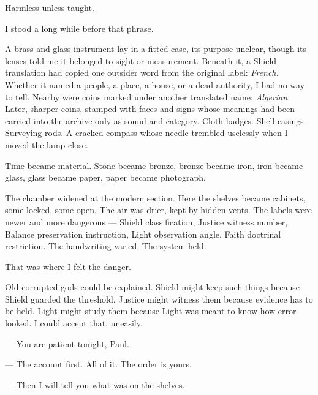 Harmless unless taught.\par

I stood a long while before that phrase.\par

A brass-and-glass instrument lay in a fitted case, its purpose unclear, though its lenses told me it belonged to sight or measurement. Beneath it, a Shield translation had copied one outsider word from the original label: \textit{French.} Whether it named a people, a place, a house, or a dead authority, I had no way to tell. Nearby were coins marked under another translated name: \textit{Algerian.} Later, sharper coins, stamped with faces and signs whose meanings had been carried into the archive only as sound and category. Cloth badges. Shell casings. Surveying rods. A cracked compass whose needle trembled uselessly when I moved the lamp close.\par

Time became material. Stone became bronze, bronze became iron, iron became glass, glass became paper, paper became photograph.\par

The chamber widened at the modern section. Here the shelves became cabinets, some locked, some open. The air was drier, kept by hidden vents. The labels were newer and more dangerous --- Shield classification, Justice witness number, Balance preservation instruction, Light observation angle, Faith doctrinal restriction. The handwriting varied. The system held.\par

That was where I felt the danger.\par

Old corrupted gods could be explained. Shield might keep such things because Shield guarded the threshold. Justice might witness them because evidence has to be held. Light might study them because Light was meant to know how error looked. I could accept that, uneasily.\par

\ornament

\begin{room}

--- You are patient tonight, Paul.

--- The account first. All of it. The order is yours.

--- Then I will tell you what was on the shelves.

\end{room}

